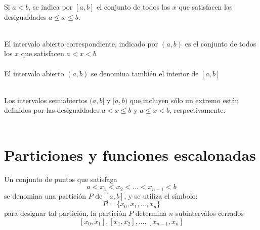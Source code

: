     \begin{tcolorbox}

        \begin{def.}
	    Si $a<b$, se indica por $\left[a,b\right]$ el conjunto de todos los $x$ que satisfacen las desigualdades $a\leq x \leq b$.\\\\
        \end{def.}

	\begin{def.}
	    El intervalo abierto correspondiente, indicado por $(a,b)$ es el conjunto de todos los $x$ que satisfacen $a<x<b$\\\\
	    El intervalo abierto $(a,b)$ se denomina también el interior de $\left[a,b\right]$ \\\\
	\end{def.}

	\begin{def.}
	    Los intervalos semiabiertos $(a,b]$ y $[a,b)$ que incluyen sólo un extremo están definidos por las desigualdades $a<x\leq b$ y $a\leq x <b$, respectivamente.\\\\
	\end{def.}

    \end{tcolorbox}

\section{Particiones y funciones escalonadas}

    \begin{tcolorbox}
	\begin{def.}
	    Un conjunto de puntos que satisfaga $$a<x_1 < x_2 < ... < x_{n-1}<b$$ se denomina una partición $P$ de $\left[a,b\right]$, y se utiliza el símbolo: $$P=\lbrace x_0,x_1,...,x_n\rbrace$$ para designar tal partición, la partición $P$ determina $n$ subinterválos cerrados $$\left[x_0,x_1\right], \left[x_1,x_2\right],...,\left[x_{n-1}, x_n\right]$$\\\\
	\end{def.}
    \end{tcolorbox}

